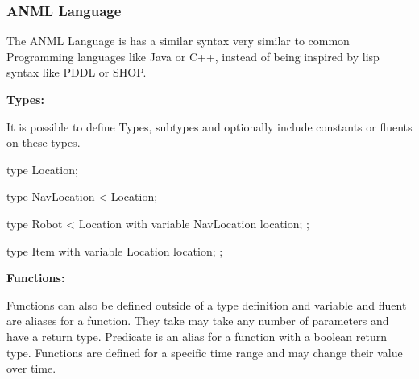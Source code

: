 \subsubsection{ANML Language}

\lstset{
  language=ANML,
  style=anmlStyle,
}

The ANML Language is has a similar syntax very similar to common Programming languages like Java or C++, instead of being inspired by lisp syntax like PDDL or SHOP.

{\bf Types:}

It is possible to define Types, subtypes and optionally include constants or fluents on these types.








\begin{anmlcode}
type Location;

type NavLocation < Location;

type Robot < Location with {
  variable NavLocation location;
};

type Item with {
  variable Location location;
};
\end{anmlcode}


{\bf Functions:}

Functions can also be defined outside of a type definition and variable and fluent are aliases for a function.
They take may take any number of parameters and have a return type.
Predicate is an alias for a function with a boolean return type.
Functions are defined for a specific time range and may change their value over time.

